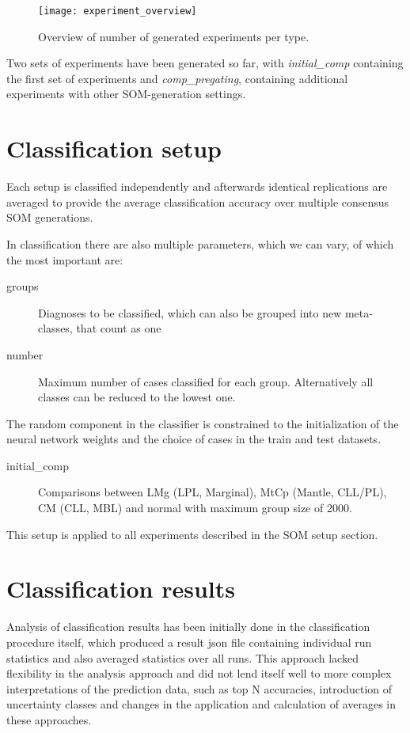 \documentclass[11pt,a4paper]{article}
\begin{document}
\begin{figure}[h]
   \centering
   \texttt{[image: experiment\_overview]}
   \caption{Overview of number of generated experiments per type.}
\end{figure}

Two sets of experiments have been generated so far, with \emph{initial\_comp} containing the first set of experiments and \emph{comp\_pregating}, containing additional experiments with other SOM-generation settings.


\section{Classification setup}

Each setup is classified independently and afterwards identical replications are averaged to provide the average classification
accuracy over multiple consensus SOM generations.

In classification there are also multiple parameters, which we can vary, of which the most important are:

\begin{description}
   \item[groups] Diagnoses to be classified, which can also be grouped into new meta-classes, that count as one
   \item[number] Maximum number of cases classified for each group. Alternatively all classes can be reduced to the lowest one.
\end{description}

The random component in the classifier is constrained to the initialization of the neural network weights and the choice of cases in the train and test datasets.

\begin{description}
   \item[initial\_comp] Comparisons between LMg (LPL, Marginal), MtCp (Mantle, CLL/PL), CM (CLL, MBL) and normal with maximum group size of 2000.
\end{description}

This setup is applied to all experiments described in the SOM setup section.


\section{Classification results}

Analysis of classification results has been initially done in the classification procedure itself, which produced a result json file containing individual run statistics and also averaged statistics over all runs.
This approach lacked flexibility in the analysis approach and did not lend itself well to more complex interpretations of the prediction data, such as top N accuracies, introduction of uncertainty classes and changes in the application and calculation of averages in these approaches.
\end{document}
